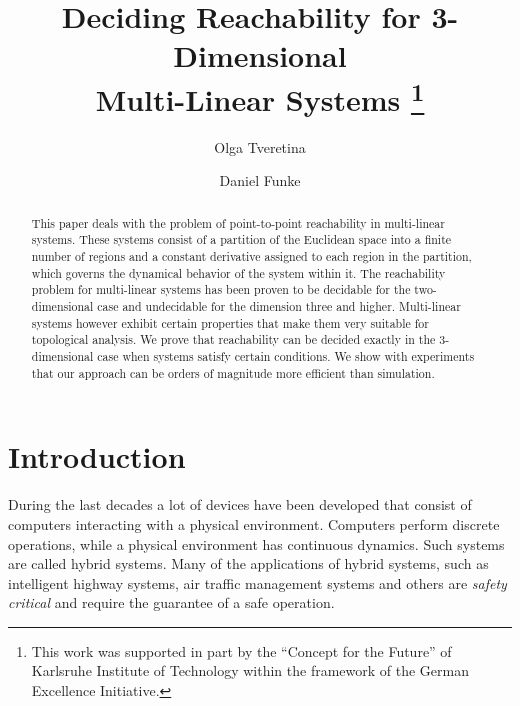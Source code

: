 \documentclass[copyright,creativecommons]{packages/eptcs}
\begin{document}
\title{Deciding Reachability 
 for 3-Dimensional\\ Multi-Linear Systems \thanks{This work
      was supported in part by the ``Concept for the Future'' of  
Karlsruhe Institute of
      Technology within the framework of the German Excellence  
Initiative.}}

\author{Olga Tveretina
\and
\qquad Daniel Funke
}
\def\titlerunning{Deciding Reachability  for 3-Dimensional Multi-Linear Systems}
\def\authorrunning{O. Tveretina, D. Funke}

\maketitle




\begin{abstract}
This paper deals with the problem of point-to-point reachability in multi-linear systems. 
These systems consist of a partition of the  Euclidean space into a finite number of regions  and a constant derivative assigned to each region in the partition, 
which governs the dynamical behavior of the system within it. The reachability problem for multi-linear systems has been proven to be decidable for the two-dimensional case  and  undecidable for  the dimension three and higher.
Multi-linear systems however exhibit certain properties that make  them very suitable for topological analysis. 
We prove that reachability can be decided exactly in the 3-dimensional case when  systems satisfy certain conditions. 
We show with experiments that our approach can be orders of magnitude more efficient  than simulation.
\end{abstract}


\section{Introduction}

During the last decades a lot of devices have been developed  that consist of computers  interacting with a physical environment. Computers perform discrete operations, while a physical environment has continuous dynamics. Such systems are called hybrid systems.
Many of the  applications of hybrid systems, such as
intelligent highway systems, air traffic management systems and others  are \emph{safety critical} and require
the guarantee of a safe operation. 
\end{document}
